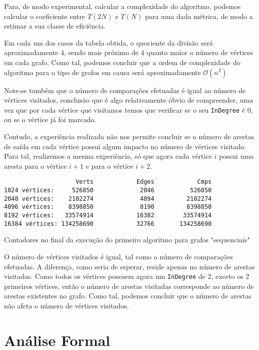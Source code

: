 Para, de modo experimental, calcular a complexidade do algoritmo,
podemos calcular o coeficiente entre $T(2N)$ e $T(N)$ para uma dada métrica, de modo a
estimar a sua classe de eficiência.

Em cada um dos casos da tabela obtida, o quociente da divisão
será aproximadamente 4, sendo mais próximo de 4 quanto maior o
número de vértices em cada grafo. Como tal, podemos concluir que
a ordem de complexidade do algoritmo para o tipo de grafos em
causa será aproximadamente $\mathcal{O}(n^2)$

Note-se também que o número de comparações efetuadas é igual ao
número de vértices visitados, conclusão que é algo relativamente
óbvio de compreender, uma vez que por cada vértice que visitamos
temos que verificar se o seu \verb|InDegree| é 0, ou se o vértice
já foi marcado.

Contudo, a experiência realizada não nos permite concluir se o
número de arestas de saída em cada vértice possui algum impacto
no número de vértices visitado. Para tal, realizemos a mesma
experiência, só que agora cada vértice $i$ possui uma aresta para
o vértice $i + 1$ e para o vértice $i + 2$.

\begin{listing}[H]
	\centering
	\begin{verbatim}
                    Verts	         Edges	          Cmps
1024 vértices:     526850	          2046	        526850
2048 vértices:    2102274	          4094	       2102274
4096 vértices:    8398850	          8190	       8398850
8192 vértices:   33574914	         16382	      33574914
16384 vértices: 134258690	         32766	     134258690
  \end{verbatim}
	\caption{Contadores no final da execução do primeiro algoritmo
		para grafos "sequenciais"}
\end{listing}

O número de vértices visitados é igual, tal como o número de
comparações efetuadas. A diferença, como seria de esperar, reside
apenas no número de arestas visitadas. Como todos os vértices
possuem agora um \verb|InDegree| de 2, exceto os 2 primeiros
vértices, então o número de arestas visitadas corresponde ao
número de arestas existentes no grafo. Como tal, podemos concluir
que o número de arestas não afeta o número de vértices visitados.

\section{Análise Formal}


